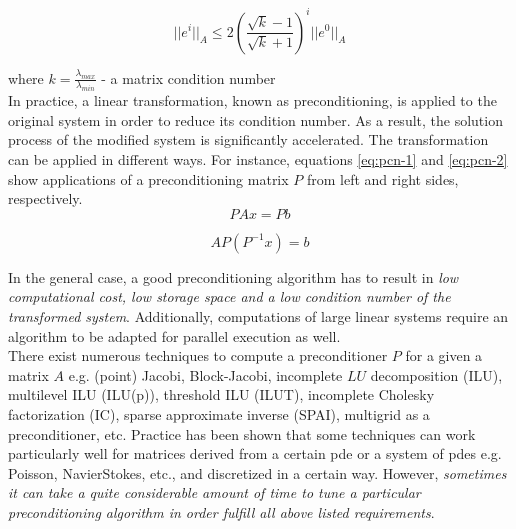 \begin{equation} \label{eq:Gmres-7}
	|| e^i ||_A \leq 2 ( \frac{\sqrt k - 1}{\sqrt k + 1} )^i || e^0 ||_A
\end{equation}

where $k = \frac{\lambda_{max}}{\lambda_{min}}$ - a matrix condition number\\


In practice, a linear transformation, known as preconditioning, is applied to the original system in order to reduce its condition number. As a result, the solution process of the modified system is significantly accelerated. The transformation can be applied in different ways. For instance, equations \ref{eq:pcn-1} and \ref{eq:pcn-2} show applications of a preconditioning matrix $P$ from left and right sides, respectively.\\


\begin{equation} \label{eq:pcn-1}
	PAx = Pb
\end{equation}


\begin{equation} \label{eq:pcn-2}
	AP(P^{-1}x) = b
\end{equation}


In the general case, a good preconditioning algorithm has to result in \textit{low computational cost, low storage space and a low condition number of the transformed system}. Additionally, computations of large linear systems require an algorithm to be adapted for parallel execution as well.\\


There exist numerous techniques to compute a preconditioner $P$ for a given a matrix $A$ e.g. (point) Jacobi, Block-Jacobi, incomplete $LU$ decomposition (ILU), multilevel ILU (ILU(p)), threshold ILU (ILUT), incomplete Cholesky factorization (IC), sparse approximate inverse (SPAI), multigrid as a preconditioner, etc. Practice has been shown that some techniques can work particularly well for matrices derived from a certain \gls{pde} or a system of \gls{pde}s e.g. Poisson, Navier\-Stokes, etc., and discretized in a certain way. However, \textit{sometimes it can take a quite considerable amount of time to tune a particular preconditioning algorithm in order fulfill all above listed requirements}.\\


